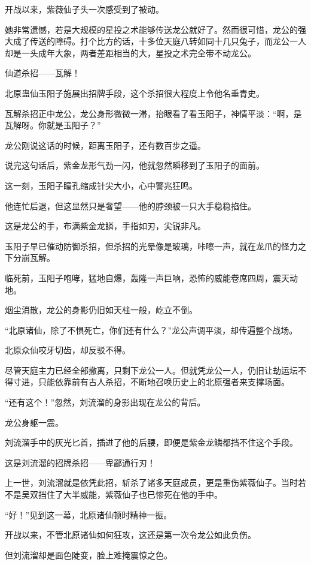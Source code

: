 \begin{this_body}
开战以来，紫薇仙子头一次感受到了被动。

她非常遗憾，若是大规模的星投之术能够传送龙公就好了。然而很可惜，龙公的强大成了传送的障碍。打个比方的话，十多位天庭八转如同十几只兔子，而龙公一人却是一头成年大象，两者差距相当的大，星投之术完全带不动龙公。

仙道杀招——瓦解！

北原蛊仙玉阳子施展出招牌手段，这个杀招很大程度上令他名垂青史。

瓦解杀招正中龙公，龙公身形微微一滞，抬眼看了看玉阳子，神情平淡：“啊，是瓦解呀。你就是玉阳子？”

龙公刚说这话的时候，距离玉阳子，还有数百步之遥。

说完这句话后，紫金龙形气劲一闪，他就忽然瞬移到了玉阳子的面前。

这一刻，玉阳子瞳孔缩成针尖大小，心中警兆狂鸣。

他连忙后退，但这显然只是奢望——他的脖颈被一只大手稳稳掐住。

这是龙公的手，布满紫金龙鳞，手指如刃，尖锐非凡。

玉阳子早已催动防御杀招，但杀招的光晕像是玻璃，咔嚓一声，就在龙爪的怪力之下分崩瓦解。

临死前，玉阳子咆哮，猛地自爆，轰隆一声巨响，恐怖的威能卷席四周，震天动地。

烟尘消散，龙公的身影仍旧如天柱一般，屹立不倒。

“北原诸仙，除了不惧死亡，你们还有什么？”龙公声调平淡，却传遍整个战场。

北原众仙咬牙切齿，却反驳不得。

尽管天庭主力已经全部撤离，只剩下龙公一人。但就凭龙公一人，仍旧让劫运坛不得寸进，只能依靠前有古人杀招，不断地召唤历史上的北原强者来支撑场面。

“还有这个！”忽然，刘流溜的身影出现在龙公的背后。

龙公身躯一震。

刘流溜手中的灰光匕首，插进了他的后腰，即便是紫金龙鳞都挡不住这个手段。

这是刘流溜的招牌杀招——卑鄙通行刃！

上一世，刘流溜就是依凭此招，斩杀了诸多天庭成员，更是重伤紫薇仙子。当时若不是吴双挡住了大半威能，紫薇仙子也已惨死在他的手中。

“好！”见到这一幕，北原诸仙顿时精神一振。

开战以来，不管北原诸仙如何狂攻，这还是第一次令龙公如此负伤。

但刘流溜却是面色陡变，脸上难掩震惊之色。


\end{this_body}
